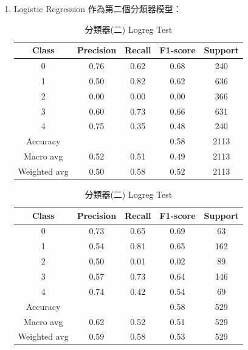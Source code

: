\begin{enumerate}
        \pagebreak
        
            \begin{enumerate}
                \item Logistic Regression 作為第二個分類器模型：

                \begin{table}[H]
                \centering
                \scriptsize
                \begin{minipage}{0.48\textwidth}
                \centering
                \begin{tabular}{c|cccc}
                \hline
                Class & Precision & Recall & F1-score & Support \\
                \hline
                0 & 0.76 & 0.62 & 0.68 & 240 \\
                1 & 0.50 & 0.82 & 0.62 & 636 \\
                2 & 0.00 & 0.00 & 0.00 & 366 \\
                3 & 0.60 & 0.73 & 0.66 & 631 \\
                4 & 0.75 & 0.35 & 0.48 & 240 \\
                \hline
                Accuracy &       &      & 0.58 & 2113 \\
                Macro avg & 0.52 & 0.51 & 0.49 & 2113 \\
                Weighted avg & 0.50 & 0.58 & 0.52 & 2113 \\
                \hline
                \end{tabular}
                \caption{分類器(二) Logreg Train}
                \label{tab:classifier_2_report_train_rf_logreg_filtered}
                \end{minipage}%
                \hfill
                \begin{minipage}{0.48\textwidth}
                \centering
                \begin{tabular}{c|cccc}
                \hline
                Class & Precision & Recall & F1-score & Support \\
                \hline
                0 & 0.73 & 0.65 & 0.69 & 63 \\
                1 & 0.54 & 0.81 & 0.65 & 162 \\
                2 & 0.50 & 0.01 & 0.02 & 89 \\
                3 & 0.57 & 0.73 & 0.64 & 146 \\
                4 & 0.74 & 0.42 & 0.54 & 69 \\
                \hline
                Accuracy &       &      & 0.58 & 529 \\
                Macro avg & 0.62 & 0.52 & 0.51 & 529 \\
                Weighted avg & 0.59 & 0.58 & 0.53 & 529 \\
                \hline
                \end{tabular}
                \caption{分類器(二) Logreg Test}
                \label{tab:classifier_2_report_test_rf_logreg_filtered}
                \end{minipage}
                \end{table}


\end{enumerate}
\end{enumerate}
